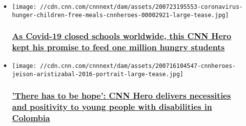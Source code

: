 \begin{itemize}
\item
  \href{/2020/07/23/world/coronavirus-hunger-children-free-meals-cnnheroes/index.html}{}

  \texttt{[image: //cdn.cnn.com/cnnnext/dam/assets/200723195553-coronavirus-hunger-children-free-meals-cnnheroes-00002921-large-tease.jpg]}

  \hypertarget{as-covid-19-closed-schools-worldwide-this-cnn-hero-kept-his-promise-to-feed-one-million-hungry-students}{%
  \subsubsection{\texorpdfstring{\href{/2020/07/23/world/coronavirus-hunger-children-free-meals-cnnheroes/index.html}{As
  Covid-19 closed schools worldwide, this CNN Hero kept his promise to
  feed one million hungry
  students}}{As Covid-19 closed schools worldwide, this CNN Hero kept his promise to feed one million hungry students}}\label{as-covid-19-closed-schools-worldwide-this-cnn-hero-kept-his-promise-to-feed-one-million-hungry-students}}
\end{itemize}

\begin{itemize}
\item
  \href{/2020/07/16/health/coronavirus-colombia-disabilities-jeison-aristizbal-cnnheroes/index.html}{}

  \texttt{[image: //cdn.cnn.com/cnnnext/dam/assets/200716104547-cnnheroes-jeison-aristizabal-2016-portrait-large-tease.jpg]}

  \hypertarget{there-has-to-be-hope-cnn-hero-delivers-necessities-and-positivity-to-young-people-with-disabilities-in-colombia}{%
  \subsubsection{\texorpdfstring{\href{/2020/07/16/health/coronavirus-colombia-disabilities-jeison-aristizbal-cnnheroes/index.html}{'There
  has to be hope': CNN Hero delivers necessities and positivity to young
  people with disabilities in
  Colombia}}{'There has to be hope': CNN Hero delivers necessities and positivity to young people with disabilities in Colombia}}\label{there-has-to-be-hope-cnn-hero-delivers-necessities-and-positivity-to-young-people-with-disabilities-in-colombia}}
\end{itemize}

